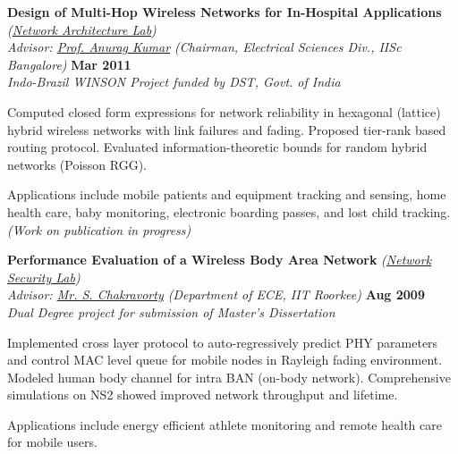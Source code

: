 \documentclass[margin,line]{resume}
\begin{document}
\begin{resume}
    \textbf{Design of Multi-Hop Wireless Networks for In-Hospital Applications} \emph{(\href{http://www.ece.iisc.ernet.in/network_labs/netarch.html}
    {Network Architecture Lab})} \\
    \hspace{-1pt}\emph{Advisor: \href{http://www.ece.iisc.ernet.in/~anurag/index.htm}{Prof. Anurag Kumar}
    (Chairman, Electrical Sciences Div., IISc Bangalore)}		\hfill \textbf{Mar 2011} \\
    \hspace{-1pt}\emph{Indo-Brazil WINSON Project funded by DST, Govt. of India} 		\\\vspace{-4mm}
    \begin{list2}
    \item Computed closed form expressions for network reliability in hexagonal (lattice) hybrid wireless networks
    with link failures and fading. Proposed tier-rank based routing protocol. Evaluated information-theoretic bounds 
    for random hybrid networks (Poisson RGG).
    \item Applications include mobile patients and equipment tracking and sensing, home health
    care, baby monitoring, electronic boarding passes, and lost child tracking.
    \emph{(Work on publication in progress)}
    \end{list2}
\vspace{-2mm}

    \textbf{Performance Evaluation of a Wireless Body Area Network}
    \emph{(\href{http://www.iitr.ac.in/departments/ECE/pages/Research+Facilities+labs+Network_Security.html}
    {Network Security Lab})}  							\\
    \emph{Advisor: \href{http://www.iitr.ac.in/~ECE/scecefec}{Mr. S. Chakravorty}
    (Department of ECE, IIT Roorkee)} \hfill \textbf{Aug 2009} 	\\
    \emph{Dual Degree project for submission of Master's Dissertation}	\\\vspace{-4mm}
    \begin{list2}
    \item Implemented cross layer protocol to auto-regressively predict PHY 
    parameters and control MAC level queue for mobile nodes in Rayleigh fading environment.
    Modeled human body channel for intra BAN (on-body network). Comprehensive
    simulations on NS2 showed improved network throughput and lifetime.
    \item Applications include energy efficient athlete monitoring and remote health care for mobile users.
    \end{list2}
\vspace{-2mm}


\end{resume}
\end{document}
